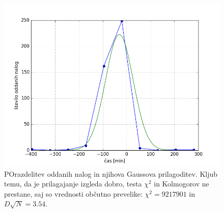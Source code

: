 \documentclass[slovene,11pt,a4paper]{article}
\numberwithin{equation}{section} %
\numberwithin{figure}{section} %
\numberwithin{table}{section} %
\begin{document}
\begin{figure}[h]
\begin{center}
\includegraphics[scale=0.5]{slike/oddaje_nalog_gauss.png}
\end{center}
\caption{POrazdelitev oddanih nalog in njihova Gaussova prilagoditev. Kljub temu, da je prilagajanje izgleda dobro, testa $\chi^2$ in Kolmogorov ne prestane, saj so vrednosti občutno prevelike: $\chi^2=9217901$ in $D\sqrt{N}=3.54$. }
\end{figure}


\end{document}
